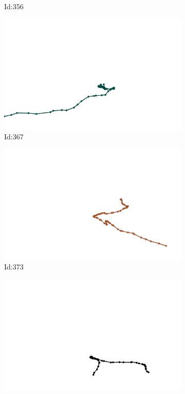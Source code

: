 \documentclass[12pt,twoside]{report}
\begin{document}
\begin{figure}
\begin{subfigure}[b]{0.20\textwidth}
\caption{Id:356}
\end{subfigure}
\begin{subfigure}[b]{0.20\textwidth}
\centering
\includegraphics[width=\textwidth]{../trajectories/367.png}
\caption{Id:367}
\end{subfigure}
\begin{subfigure}[b]{0.20\textwidth}
\centering
\includegraphics[width=\textwidth]{../trajectories/373.png}
\caption{Id:373}
\end{subfigure}
\begin{subfigure}[b]{0.20\textwidth}
\centering
\includegraphics[width=\textwidth]{../trajectories/420.png}

\end{subfigure}
\end{figure}
\end{document}
